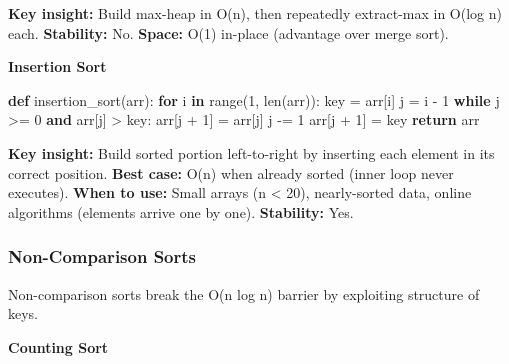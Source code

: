 \documentclass[11pt]{article}
\newenvironment{Shaded}{\begin{snugshade}}{\end{snugshade}}
\newcommand{\BuiltInTok}[1]{\textcolor[rgb]{0.50,0.55,0.55}{#1}}
\newcommand{\ControlFlowTok}[1]{\textcolor[rgb]{0.99,0.74,0.29}{\textbf{#1}}}
\newcommand{\DecValTok}[1]{\textcolor[rgb]{0.96,0.45,0.00}{#1}}
\newcommand{\KeywordTok}[1]{\textcolor[rgb]{0.81,0.81,0.76}{\textbf{#1}}}
\newcommand{\NormalTok}[1]{\textcolor[rgb]{0.81,0.81,0.76}{#1}}
\newcommand{\OperatorTok}[1]{\textcolor[rgb]{0.81,0.81,0.76}{#1}}
\begin{document}
\textbf{Key insight:} Build max-heap in O(n), then repeatedly extract-max in O(log n) each.
\textbf{Stability:} No. \textbf{Space:} O(1) in-place (advantage over merge sort).

\textbf{Insertion Sort}


\begin{Shaded}
\begin{Highlighting}[]
\KeywordTok{def}\NormalTok{ insertion\_sort(arr):}
    \ControlFlowTok{for}\NormalTok{ i }\KeywordTok{in} \BuiltInTok{range}\NormalTok{(}\DecValTok{1}\NormalTok{, }\BuiltInTok{len}\NormalTok{(arr)):}
\NormalTok{        key }\OperatorTok{=}\NormalTok{ arr[i]}
\NormalTok{        j }\OperatorTok{=}\NormalTok{ i }\OperatorTok{{-}} \DecValTok{1}
        \ControlFlowTok{while}\NormalTok{ j }\OperatorTok{\textgreater{}=} \DecValTok{0} \KeywordTok{and}\NormalTok{ arr[j] }\OperatorTok{\textgreater{}}\NormalTok{ key:}
\NormalTok{            arr[j }\OperatorTok{+} \DecValTok{1}\NormalTok{] }\OperatorTok{=}\NormalTok{ arr[j]}
\NormalTok{            j }\OperatorTok{{-}=} \DecValTok{1}
\NormalTok{        arr[j }\OperatorTok{+} \DecValTok{1}\NormalTok{] }\OperatorTok{=}\NormalTok{ key}
    \ControlFlowTok{return}\NormalTok{ arr}
\end{Highlighting}
\end{Shaded}

\textbf{Key insight:} Build sorted portion left-to-right by inserting each element in its correct position.
\textbf{Best case:} O(n) when already sorted (inner loop never executes).
\textbf{When to use:} Small arrays (n \textless{} 20), nearly-sorted data, online algorithms (elements arrive one by one).
\textbf{Stability:} Yes.

\subsubsection{Non-Comparison Sorts}\label{non-comparison-sorts}

Non-comparison sorts break the O(n log n) barrier by exploiting structure of keys.

\textbf{Counting Sort}

\end{document}
